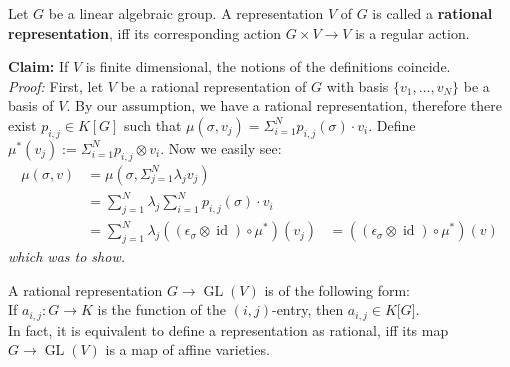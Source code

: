 \begin{definition}
  Let $G$ be a linear algebraic group.
  A representation $V$ of $G$ is called a \textbf{rational representation}, iff its corresponding action $ G \times V \longrightarrow V $ is a regular action.
\end{definition}

\textbf{Claim:} If $V$ is finite dimensional, the notions of the definitions coincide.\\
\textit{Proof:} First, let $V$ be a rational representation of $G$ with basis $\{ v_1 , \ldots , v_N \}$ be a basis of $V$.
By our assumption, we have a rational representation, therefore there exist $p_{i,j} \in K \left\lbrack G \right\rbrack$ such that $\mu\left( \sigma, v_j \right) = \Sigma_{i=1}^{N} p_{i,j}\left(\sigma\right) \cdot v_i$.
Define $\mu^\ast \left( v_j \right) := \Sigma_{i=1}^{N} p_{i,j} \otimes v_i$.
Now we easily see:
\begin{equation}
  \begin{aligned}
    \mu\left(\sigma,v\right)
    &= \mu \left(\sigma, \Sigma_{j=1}^N \lambda_j v_j \right) \\
    &= \sum_{j=1}^N \lambda_j  \sum_{i=1}^N p_{i,j}\left(\sigma\right) \cdot v_i \\
    &= \sum_{j=1}^N \lambda_j \left(\left(\epsilon_\sigma \otimes \operatorname{id} \right) \circ \mu^\ast \right) \left(v_j \right)
    &= \left(\left(\epsilon_\sigma \otimes \operatorname{id} \right) \circ \mu^\ast \right) \left(v \right)
  \end{aligned}
\end{equation}
\textit{which was to show.}

\begin{remark}
  A rational representation $ G \longrightarrow \operatorname{GL}\left(V\right) $ is of the following form:\\
  If $ a_{i,j} : G \longrightarrow K $ is the function of the $\left( i,j \right) $-entry, then $ a_{i,j} \in K\lbrack G\rbrack $.\\
  In fact, it is equivalent to define a representation as rational, iff its map $ G \longrightarrow \operatorname{GL} \left( V \right) $ is a map of affine varieties.
\end{remark}

